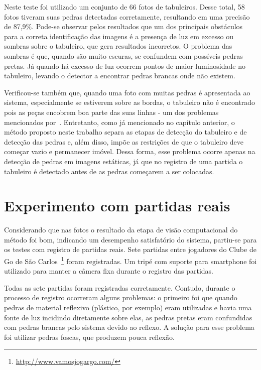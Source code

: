 Neste teste foi utilizado um conjunto de 66 fotos de tabuleiros. Desse total, 58 fotos tiveram suas pedras detectadas corretamente, resultando em uma precisão de 87,9\%. 
Pode-se observar pelos resultados que um dos principais obstáculos para a correta identificação das imagens é a presença de luz em excesso ou sombras sobre o tabuleiro, que gera resultados incorretos. O problema das sombras é que, quando são muito escuras, se confundem com possíveis pedras pretas. Já quando há excesso de luz ocorrem pontos de maior luminosidade no tabuleiro, levando o detector a encontrar pedras brancas onde não existem.

Verificou-se também que, quando uma foto com muitas pedras é apresentada ao sistema, especialmente se estiverem sobre as bordas, o tabuleiro não é encontrado pois as peças encobrem boa parte das suas linhas - um dos problemas mencionados por~. Entretanto, como já mencionado no capítulo anterior, o método proposto neste trabalho separa as etapas de detecção do tabuleiro e de detecção das pedras e, além disso, impõe as restrições de que o tabuleiro deve começar vazio e permanecer imóvel. Dessa forma, esse problema ocorre apenas na detecção de pedras em imagens estáticas, já que no registro de uma partida o tabuleiro é detectado antes de as pedras começarem a ser colocadas.

\section{Experimento com partidas reais}

Considerando que nas fotos o resultado da etapa de visão computacional do método foi bom, indicando um desempenho satisfatório do sistema, partiu-se para os testes com registro de partidas reais. Sete partidas entre jogadores do Clube de Go de São Carlos~\footnote{\url{http://www.vamosjogargo.com/}} foram registradas. Um tripé com suporte para smartphone foi utilizado para manter a câmera fixa durante o registro das partidas.

Todas as sete partidas foram registradas corretamente. Contudo, durante o processo de registro ocorreram alguns problemas: o primeiro foi que quando pedras de material reflexivo (plástico, por exemplo) eram utilizadas e havia uma fonte de luz incidindo diretamente sobre elas, as pedras pretas eram confundidas com pedras brancas pelo sistema devido ao reflexo. A solução para esse problema foi utilizar pedras foscas, que produzem pouca reflexão.

